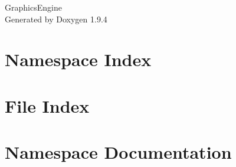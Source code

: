 \documentclass[twoside]{book}
\newcommand{\+}{\discretionary{\mbox{\scriptsize$\hookleftarrow$}}{}{}}
\newcommand{\clearemptydoublepage}{%
    \newpage{\pagestyle{empty}\cleardoublepage}%
  }
\begin{document}
  \raggedbottom
    \hypersetup{pageanchor=false,
                bookmarksnumbered=true,
                pdfencoding=unicode
               }
  \begin{titlepage}
  \vspace*{7cm}
  \begin{center}%
  {\Large Graphics\+Engine}\\
  \vspace*{1cm}
  {\large Generated by Doxygen 1.9.4}\\
  \end{center}
  \end{titlepage}
  \clearemptydoublepage
  \tableofcontents
  \clearemptydoublepage
  \hypersetup{pageanchor=true}
\chapter{Namespace Index}

\chapter{File Index}

\chapter{Namespace Documentation}



\end{document}
